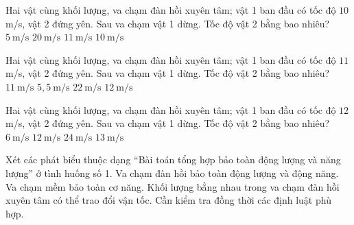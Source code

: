\begin{ex}
Hai vật cùng khối lượng, va chạm đàn hồi xuyên tâm; vật 1 ban đầu có tốc độ $10$ m/s, vật 2 đứng yên. Sau va chạm vật 1 dừng. Tốc độ vật 2 bằng bao nhiêu?
\choice
{$5\ \mathrm{m/s}$}
{$20\ \mathrm{m/s}$}
{$11\ \mathrm{m/s}$}
{\True $10\ \mathrm{m/s}$}
\end{ex}

\begin{ex}
Hai vật cùng khối lượng, va chạm đàn hồi xuyên tâm; vật 1 ban đầu có tốc độ $11$ m/s, vật 2 đứng yên. Sau va chạm vật 1 dừng. Tốc độ vật 2 bằng bao nhiêu?
\choice
{\True $11\ \mathrm{m/s}$}
{$5,5\ \mathrm{m/s}$}
{$22\ \mathrm{m/s}$}
{$12\ \mathrm{m/s}$}
\end{ex}

\begin{ex}
Hai vật cùng khối lượng, va chạm đàn hồi xuyên tâm; vật 1 ban đầu có tốc độ $12$ m/s, vật 2 đứng yên. Sau va chạm vật 1 dừng. Tốc độ vật 2 bằng bao nhiêu?
\choice
{$6\ \mathrm{m/s}$}
{\True $12\ \mathrm{m/s}$}
{$24\ \mathrm{m/s}$}
{$13\ \mathrm{m/s}$}
\end{ex}

\begin{ex}
Xét các phát biểu thuộc dạng “Bài toán tổng hợp bảo toàn động lượng và năng lượng” ở tình huống số 1.
\choiceTF
{\True Va chạm đàn hồi bảo toàn động lượng và động năng.}
{Va chạm mềm bảo toàn cơ năng.}
{\True Khối lượng bằng nhau trong va chạm đàn hồi xuyên tâm có thể trao đổi vận tốc.}
{\True Cần kiểm tra đồng thời các định luật phù hợp.}
\end{ex}

